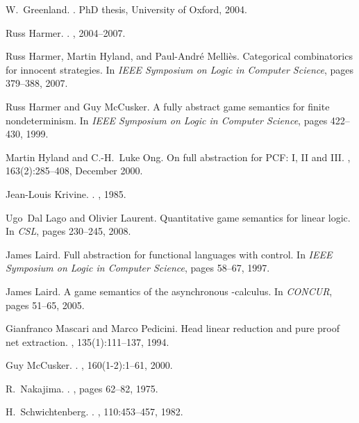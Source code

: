\documentclass{article}
\begin{document}
\begin{thebibliography}{10}
W.~Greenland.
.
\newblock PhD thesis, {University of Oxford}, 2004.

Russ Harmer.
.
, 2004--2007.

Russ Harmer, Martin Hyland, and Paul-Andr{\'e} Melli{\`e}s.
\newblock Categorical combinatorics for innocent strategies.
\newblock In {\em IEEE Symposium on Logic in Computer Science}, pages 379--388,
  2007.

Russ Harmer and Guy McCusker.
\newblock A fully abstract game semantics for finite nondeterminism.
\newblock In {\em IEEE Symposium on Logic in Computer Science}, pages 422--430,
  1999.

Martin Hyland and C.-H.~Luke Ong.
\newblock On full abstraction for {PCF}: {I}, {II} and {III}.
, 163(2):285--408, December 2000.

Jean-Louis Krivine.
.
, 1985.

Ugo~Dal Lago and Olivier Laurent.
\newblock Quantitative game semantics for linear logic.
\newblock In {\em CSL}, pages 230--245, 2008.

James Laird.
\newblock Full abstraction for functional languages with control.
\newblock In {\em IEEE Symposium on Logic in Computer Science}, pages 58--67,
  1997.

James Laird.
\newblock A game semantics of the asynchronous -calculus.
\newblock In {\em CONCUR}, pages 51--65, 2005.

Gianfranco Mascari and Marco Pedicini.
\newblock Head linear reduction and pure proof net extraction.
, 135(1):111--137, 1994.

Guy McCusker.
.
, 160(1-2):1--61, 2000.

R.~Nakajima.
.
, pages 62--82,
  1975.

H.~Schwichtenberg.
.
,
  110:453--457, 1982.

\end{thebibliography}
\end{document}
